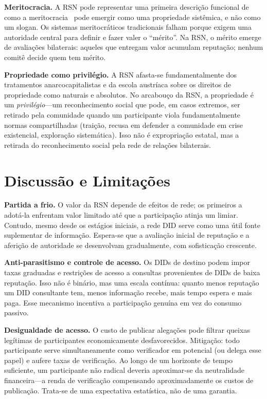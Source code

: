 \documentclass[11pt,a4paper,twocolumn]{article}
\begin{document}
\textbf{Meritocracia.} A RSN pode representar uma primeira descrição funcional de como a meritocracia~\cite{young1958} pode emergir como uma propriedade sistêmica, e não como um slogan. Os sistemas meritocráticos tradicionais falham porque exigem uma autoridade central para definir e fazer valer o ``mérito''. Na RSN, o mérito emerge de avaliações bilaterais: aqueles que entregam valor acumulam reputação; nenhum comitê decide quem tem mérito.

\textbf{Propriedade como privilégio.} A RSN afasta-se fundamentalmente dos tratamentos anarcocapitalistas e da escola austríaca sobre os direitos de propriedade como naturais e absolutos. No arcabouço da RSN, a propriedade é um \emph{privilégio}---um reconhecimento social que pode, em casos extremos, ser retirado pela comunidade quando um participante viola fundamentalmente normas compartilhadas (traição, recusa em defender a comunidade em crise existencial, exploração sistemática). Isso não é expropriação estatal, mas a retirada do reconhecimento social pela rede de relações bilaterais.

\section{Discussão e Limitações}

\textbf{Partida a frio.} O valor da RSN depende de efeitos de rede; os primeiros a adotá-la enfrentam valor limitado até que a participação atinja um limiar. Contudo, mesmo desde os estágios iniciais, a rede DID serve como uma útil fonte suplementar de informação. Espera-se que a avaliação inicial de reputação e a aferição de autoridade se desenvolvam gradualmente, com sofisticação crescente.

\textbf{Anti-parasitismo e controle de acesso.} Os DIDs de destino podem impor taxas graduadas e restrições de acesso a consultas provenientes de DIDs de baixa reputação. Isso não é binário, mas uma escala contínua: quanto menos reputação um DID consultante tem, menos informação recebe, mais tempo espera e mais paga. Esse mecanismo incentiva a participação genuína em vez do consumo passivo.

\textbf{Desigualdade de acesso.} O custo de publicar alegações pode filtrar queixas legítimas de participantes economicamente desfavorecidos. Mitigação: todo participante serve simultaneamente como verificador em potencial (ou delega esse papel) e aufere taxas de verificação. Ao longo de um horizonte de tempo suficiente, um participante não radical deveria aproximar-se da neutralidade financeira---a renda de verificação compensando aproximadamente os custos de publicação. Trata-se de uma expectativa estatística, não de uma garantia.
\end{document}
